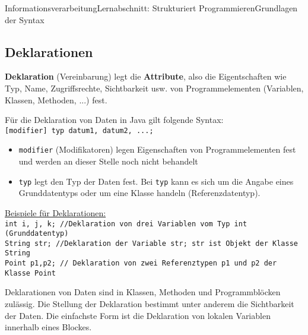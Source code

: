 \documentclass[11pt,oneside,openany,headings=optiontotoc,11pt,numbers=noenddot]{article}
\begin{document}
\begin{worksheet}{Informationsverarbeitung}{Lernabschnitt: Strukturiert Programmieren}{Grundlagen der Syntax}
		\subsection{Deklarationen}
		\textbf{Deklaration} (Vereinbarung) legt die \textbf{Attribute}, also die Eigentschaften wie Typ, Name, Zugriffsrechte, Sichtbarkeit usw. von Programmelementen (Variablen, Klassen, Methoden, ...) fest.\\
		\par\noindent
		Für die Deklaration von Daten in Java gilt folgende Syntax:\\
		\lstinline[style=JavaInputStyle]|[modifier] typ datum1, datum2, ...;|
		\begin{itemize}
			\item {\lstinline[style=JavaInputStyle]|modifier|} (Modifikatoren) legen Eigenschaften von Programmelementen fest und werden an dieser Stelle noch nicht behandelt
			\item {\lstinline[style=JavaInputStyle]|typ|} legt den Typ der Daten fest. Bei {\lstinline[style=JavaInputStyle]|typ|} kann es sich um die Angabe eines Grunddatentyps oder um eine Klasse handeln (Referenzdatentyp).
		\end{itemize}
		\underline{Beispiele für Deklarationen:}\\
		\lstinline[style=JavaInputStyle]|int i, j, k; //Deklaration von drei Variablen vom Typ int (Grunddatentyp)|\\
		\lstinline[style=JavaInputStyle]|String str; //Deklaration der Variable str; str ist Objekt der Klasse String|\\
		\lstinline[style=JavaInputStyle]|Point p1,p2; // Deklaration von zwei Referenztypen p1 und p2 der Klasse Point|\\
		\par\noindent
		Deklarationen von Daten sind in Klassen, Methoden und Programmblöcken zulässig. Die Stellung der Deklaration bestimmt unter anderem die Sichtbarkeit der Daten. Die einfachste Form ist die Deklaration von lokalen Variablen innerhalb eines Blockes.
		

\end{worksheet}
\end{document}
